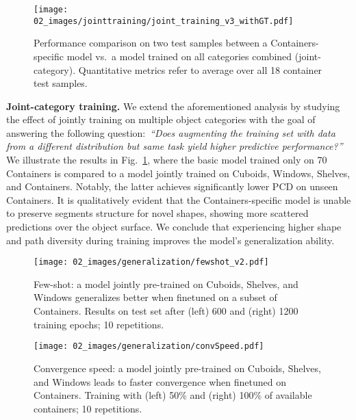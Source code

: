 \begin{figure}[] %
    \centering
    \texttt{[image: 02\_images/jointtraining/joint\_training\_v3\_withGT.pdf]}
    \caption{Performance comparison on two test samples between a Containers-specific model vs.~a model trained on all categories combined (joint-category). Quantitative metrics refer to average over all 18 container test samples.}
    \label{fig:jointtraining}
\end{figure}



\noindent \textbf{Joint-category training.}
We extend the aforementioned analysis by studying the effect of jointly training \ours on multiple object categories with the goal of answering the following question:~\emph{``Does augmenting the training set with data from a different distribution but same task yield higher predictive performance?''}
We illustrate the results in Fig.~\ref{fig:jointtraining}, where the basic model trained only on 70 Containers is compared to a model jointly trained  on Cuboids, Windows, Shelves, and Containers.
Notably, the latter achieves significantly lower PCD on unseen Containers. It is qualitatively evident that the Containers-specific model is unable to preserve segments structure for novel shapes, showing more scattered predictions over the object surface. 
We conclude that experiencing higher shape and path diversity during training improves the model's generalization ability.


\begin{figure}[]
    \centering
    \texttt{[image: 02\_images/generalization/fewshot\_v2.pdf]}
    \caption{
    Few-shot: a model jointly pre-trained on Cuboids, Shelves, and Windows generalizes better when finetuned on a subset of Containers. Results on test set after (left) 600 and (right) 1200 training epochs; 10 repetitions.
    }
    \label{fig:few_shot}
\end{figure}

\begin{figure}[]
    \centering
    \texttt{[image: 02\_images/generalization/convSpeed.pdf]}
    \caption{
    Convergence speed: a model jointly pre-trained on Cuboids, Shelves, and Windows leads to faster convergence when finetuned on Containers. Training with (left) 50\% and (right) 100\% of available containers; 10 repetitions.
    }
    \label{fig:conv_speed}
\end{figure}

